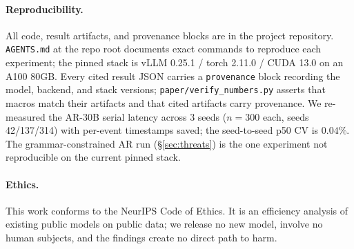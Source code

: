 \paragraph{Reproducibility.}

All code, result artifacts, and provenance blocks are in the project
repository. \texttt{AGENTS.md} at the repo root documents exact
commands to reproduce each experiment; the pinned stack is
vLLM 0.25.1 / torch 2.11.0 / CUDA 13.0 on an A100 80GB. Every cited
result JSON carries a \texttt{provenance} block recording the model,
backend, and stack versions; \texttt{paper/verify\_numbers.py} asserts
that macros match their artifacts and that cited artifacts carry
provenance. We re-measured the AR-30B serial latency across 3 seeds
($n{=}300$ each, seeds 42/137/314) with per-event timestamps saved;
the seed-to-seed p50 CV is $0.04\%$. The grammar-constrained AR run
(\S\ref{sec:threats}) is the one experiment not reproducible on the
current pinned stack.

\paragraph{Ethics.}

This work conforms to the NeurIPS Code of Ethics. It is an efficiency
analysis of existing public models on public data; we release no new
model, involve no human subjects, and the findings create no direct
path to harm.
